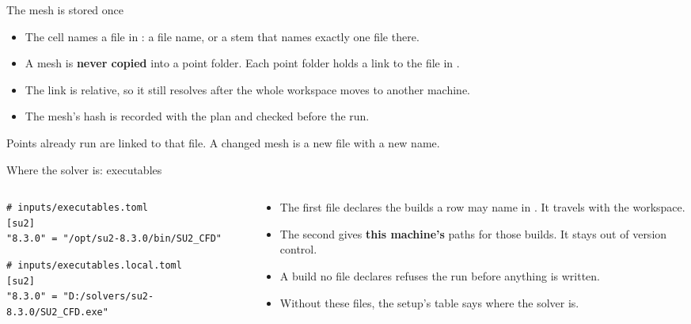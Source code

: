 \begin{frame}{The mesh is stored once}
\begin{itemize}
  \item The  cell names a file in : a file
        name, or a stem that names exactly one file there.
  \item A mesh is \textbf{never copied} into a point folder. Each point
        folder holds a link to the file in .
  \item The link is relative, so it still resolves after the whole workspace
        moves to another machine.
  \item The mesh's hash is recorded with the plan and checked before the
        run.
\end{itemize}
\begin{cfdbpitfall}
Points already run are linked to that file. A changed mesh is a new file with
a new name.
\end{cfdbpitfall}
\end{frame}

\begin{frame}[fragile]{Where the solver is: executables}
\begin{columns}[T]
\begin{column}{0.5\textwidth}
\begin{lstlisting}[style=cfdbtoml]
# inputs/executables.toml
[su2]
"8.3.0" = "/opt/su2-8.3.0/bin/SU2_CFD"
\end{lstlisting}
\begin{lstlisting}[style=cfdbtoml]
# inputs/executables.local.toml
[su2]
"8.3.0" = "D:/solvers/su2-8.3.0/SU2_CFD.exe"
\end{lstlisting}
\end{column}
\begin{column}{0.46\textwidth}
\begin{itemize}\small
  \item The first file declares the builds a row may name in
        . It travels with the workspace.
  \item The second gives \textbf{this machine's} paths for those builds. It
        stays out of version control.
  \item A build no file declares refuses the run before anything is
        written.
  \item Without these files, the setup's \code{[solver]} table says where
        the solver is.
\end{itemize}
\end{column}
\end{columns}
\end{frame}
